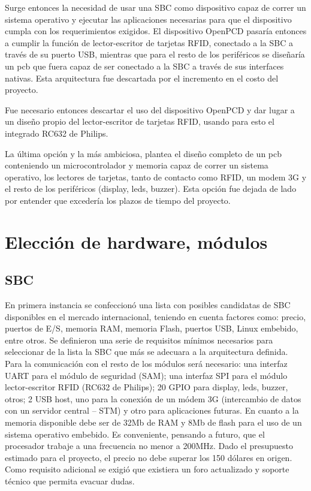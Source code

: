 Surge entonces la necesidad de usar una SBC como dispositivo capaz de correr un sistema operativo y ejecutar las aplicaciones necesarias para que el dispositivo cumpla con los requerimientos exigidos. El dispositivo OpenPCD pasaría entonces a cumplir la función de lector-escritor de tarjetas RFID, conectado a la SBC a través de su puerto USB, mientras que para el resto de los periféricos se diseñaría un pcb que fuera capaz de ser conectado a la SBC a través de sus interfaces nativas. Esta arquitectura fue descartada por el incremento en el costo del proyecto.

Fue necesario entonces descartar el uso del dispositivo OpenPCD y dar lugar a un diseño propio del lector-escritor de tarjetas RFID, usando para esto el integrado RC632 de Philips.

La última opción y la más ambiciosa, plantea el diseño completo de un pcb conteniendo un microcontrolador y memoria capaz de correr un sistema operativo, los lectores de tarjetas, tanto de contacto como RFID, un modem 3G y el resto de los periféricos (display, leds, buzzer). Esta opción fue dejada de lado por entender que excedería los plazos de tiempo del proyecto.


\section{Elecci\'on de hardware, m\'odulos}

\subsection{SBC}
En primera instancia se confeccionó una lista con posibles candidatas de SBC disponibles en el mercado internacional, teniendo en cuenta factores como: precio, puertos de E/S, memoria RAM, memoria Flash, puertos USB, Linux embebido, entre otros.
Se definieron una serie de requisitos mínimos necesarios para seleccionar de la lista la SBC que más se adecuara a la arquitectura definida.
Para la comunicación con el resto de los módulos será necesario: una interfaz UART para el módulo de seguridad (SAM); una interfaz SPI para el módulo lector-escritor RFID (RC632 de Philips); 20 GPIO para display, leds, buzzer, otros; 2 USB host, uno para la conexión de un módem 3G (intercambio de datos con un servidor central – STM) y otro para aplicaciones futuras. En cuanto a la memoria disponible debe ser de 32Mb de RAM y 8Mb de flash para el uso de un sistema operativo embebido. Es conveniente, pensando a futuro, que el procesador trabaje a una frecuencia no menor a 200MHz.
Dado el presupuesto estimado para el proyecto, el precio no debe superar los 150 dólares en origen.
Como requisito adicional se exigió que existiera un foro actualizado y soporte técnico que permita evacuar dudas.

